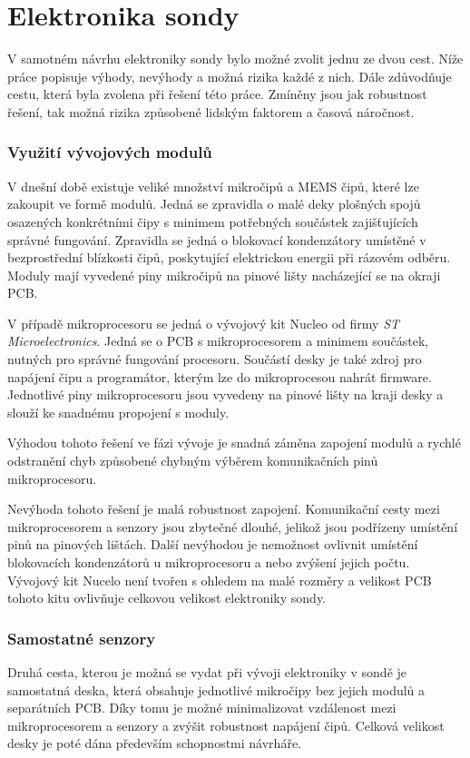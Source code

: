 \documentclass[twoside]{ctuthesis}
\theoremstyle{plain}
\theoremstyle{definition}
\theoremstyle{note}
\begin{document}
	
	\section{Elektronika sondy}

	V samotném návrhu elektroniky sondy bylo možné zvolit jednu ze dvou cest. Níže práce popisuje výhody, nevýhody a možná rizika každé z nich. Dále zdůvodňuje cestu, která byla zvolena při řešení této práce. Zmíněny jsou jak robustnost řešení, tak možná rizika způsobené lidským faktorem a časová náročnost.

		\subsubsection{Využití vývojových modulů}
		V dnešní době existuje veliké množství mikročipů a MEMS čipů, které lze zakoupit ve formě modulů. Jedná se zpravidla o malé deky plošných spojů osazených konkrétními čipy s minimem potřebných součástek zajišťujících správné fungování. Zpravidla se jedná o blokovací kondenzátory umístěné v bezprostřední blízkosti čipů, poskytující elektrickou energii při rázovém odběru. Moduly mají vyvedené piny mikročipů na pinové lišty nacházející se na okraji PCB. 

		V případě mikroprocesoru se jedná o vývojový kit Nucleo od firmy \textit{ST Microelectronics}. Jedná se o PCB s mikroprocesorem a minimem součástek, nutných pro správné fungování procesoru. Součástí desky je také zdroj pro napájení čipu a programátor, kterým lze do mikroprocesou nahrát firmware. Jednotlivé piny mikroprocesoru jsou vyvedeny na pinové lišty na kraji desky a slouží ke snadnému propojení s moduly. 

		Výhodou tohoto řešení ve fázi vývoje je snadná záměna zapojení modulů a rychlé odstranění chyb způsobené chybným výběrem komunikačních pinů mikroprocesoru.

		Nevýhoda tohoto řešení je malá robustnost zapojení. Komunikační cesty mezi mikroprocesorem a senzory jsou zbytečné dlouhé, jelikož jsou podřízeny umístění pinů na pinových lištách. Další nevýhodou je nemožnost ovlivnit umístění blokovacích kondenzátorů u mikroprocesoru a nebo zvýšení jejich počtu. Vývojový kit Nucelo není tvořen s ohledem na malé rozměry a velikost PCB tohoto kitu ovlivňuje celkovou velikost elektroniky sondy.

		\subsubsection{Samostatné senzory}
		Druhá cesta, kterou je možná se vydat při vývoji elektroniky v sondě je samostatná deska, která obsahuje jednotlivé mikročipy bez jejich modulů a separátních PCB. Díky tomu je možné minimalizovat vzdálenost mezi mikroprocesorem a senzory a zvýšit robustnost napájení čipů. Celková velikost desky je poté dána především schopnostmi návrháře. 
\end{document}
